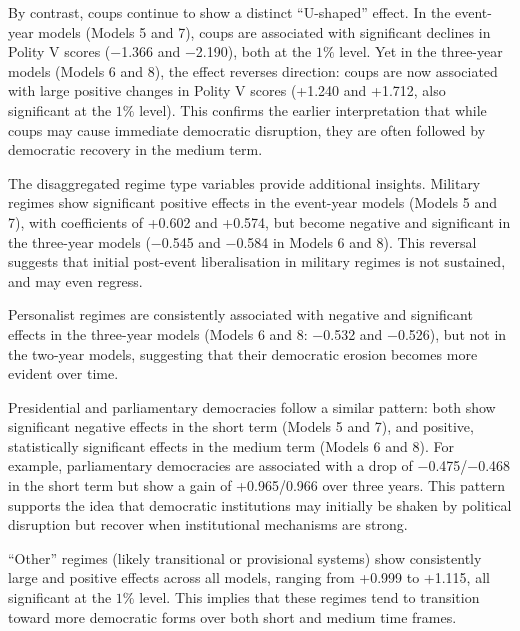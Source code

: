 \documentclass[
  12pt,
]{report}
\begin{document}
By contrast, coups continue to show a distinct ``U-shaped'' effect. In
the event-year models (Models 5 and 7), coups are associated with
significant declines in Polity V scores (−1.366 and −2.190), both at the
\(1\%\) level. Yet in the three-year models (Models 6 and 8), the effect
reverses direction: coups are now associated with large positive changes
in Polity V scores (+1.240 and +1.712, also significant at the \(1\%\)
level). This confirms the earlier interpretation that while coups may
cause immediate democratic disruption, they are often followed by
democratic recovery in the medium term.

The disaggregated regime type variables provide additional insights.
Military regimes show significant positive effects in the event-year
models (Models 5 and 7), with coefficients of +0.602 and +0.574, but
become negative and significant in the three-year models (−0.545 and
−0.584 in Models 6 and 8). This reversal suggests that initial
post-event liberalisation in military regimes is not sustained, and may
even regress.

Personalist regimes are consistently associated with negative and
significant effects in the three-year models (Models 6 and 8: −0.532 and
−0.526), but not in the two-year models, suggesting that their
democratic erosion becomes more evident over time.

Presidential and parliamentary democracies follow a similar pattern:
both show significant negative effects in the short term (Models 5 and
7), and positive, statistically significant effects in the medium term
(Models 6 and 8). For example, parliamentary democracies are associated
with a drop of −0.475/−0.468 in the short term but show a gain of
+0.965/0.966 over three years. This pattern supports the idea that
democratic institutions may initially be shaken by political disruption
but recover when institutional mechanisms are strong.

``Other'' regimes (likely transitional or provisional systems) show
consistently large and positive effects across all models, ranging from
+0.999 to +1.115, all significant at the \(1\%\) level. This implies
that these regimes tend to transition toward more democratic forms over
both short and medium time frames.
\end{document}
